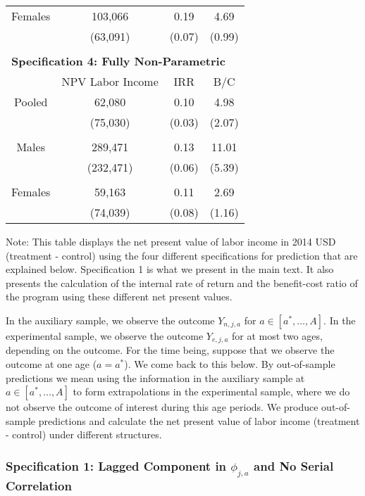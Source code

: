 \begin{table}[H]
\begin{threeparttable}
\begin{tabular}{cccc}
Females & 103,066 & 0.19  & 4.69 \\  
          & (63,091) & (0.07)  & (0.99) \\ \midrule \\ 
\multicolumn{4}{l}{\textbf{Specification 4:  Fully Non-Parametric}} \\ 
& NPV Labor Income & IRR & B/C \\
Pooled  & 62,080 & 0.10 & 4.98 \\ 
             & (75,030) & (0.03)  & (2.07) \\ \\ 
Males & 289,471& 0.13  & 11.01 \\ 
               & (232,471) & (0.06) & (5.39) \\ \\ 
Females & 59,163 &  0.11 & 2.69 \\  
          & (74,039) & (0.08)  & (1.16) \\ \bottomrule
\end{tabular}
\begin{tablenotes}
\footnotesize
\item Note: This table displays the net present value of labor income in 2014 USD (treatment - control) using the four different specifications for prediction that are explained below. Specification 1 is what we present in the main text. It also presents the calculation of the internal rate of return and the benefit-cost ratio of the program using these different net present values.
\end{tablenotes}
\end{threeparttable}
\end{table}

\noindent In the auxiliary sample, we observe the outcome $Y_{n,j,a}$ for $a \in [a^*, \ldots, A]$. In the experimental sample, we observe the outcome $Y_{e,j,a}$ for at most two ages, depending on the outcome. For the time being, suppose that we observe the outcome at one age ($a = a^*$). We come back to this below. By out-of-sample predictions we mean using the information in the auxiliary sample at  $a \in [a^*, \ldots, A]$ to form extrapolations in the experimental sample, where we do not observe the outcome of interest during this age periods. We produce out-of-sample predictions and calculate the net present value of labor income (treatment - control) under different structures.\\ 

\subsubsection{Specification 1: Lagged Component in $\phi_{j,a}$ and No Serial Correlation}

